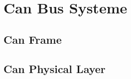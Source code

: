 \section{Can Bus Systeme}
\label{sec:Can_Bus_Controller}


\subsection{Can Frame}
\label{subsec:can_bus_controller:can_frame}


\subsection{Can Physical Layer}
\label{subsec:can_bus_controller:can_physical_layer}




